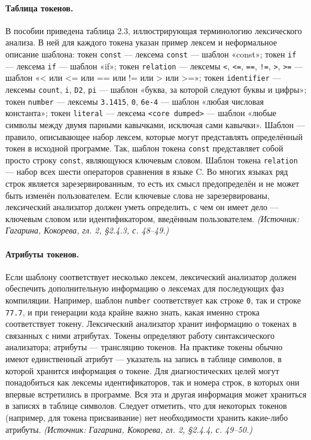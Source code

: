 \documentclass[a4paper,12pt]{article}
\begin{document}
\paragraph{Таблица токенов.}
В пособии приведена таблица 2.3, иллюстрирующая терминологию лексического анализа. В ней для каждого токена указан пример лексем и неформальное описание шаблона: токен \texttt{const} — лексема \texttt{const} — шаблон «const»; токен \texttt{if} — лексема \texttt{if} — шаблон «if»; токен \texttt{relation} — лексемы \texttt{<}, \texttt{<=}, \texttt{==}, \texttt{!=}, \texttt{>}, \texttt{>=} — шаблон «< или <= или == или != или > или >=»; токен \texttt{identifier} — лексемы \texttt{count}, \texttt{i}, \texttt{D2}, \texttt{pi} — шаблон «буква, за которой следуют буквы и цифры»; токен \texttt{number} — лексемы \texttt{3.1415}, \texttt{0}, \texttt{6e-4} — шаблон «любая числовая константа»; токен \texttt{literal} — лексема \texttt{<core dumped>} — шаблон «любые символы между двумя парными кавычками, исключая сами кавычки». Шаблон — правило, описывающее набор лексем, которые могут представлять определённый токен в исходной программе. Так, шаблон токена \texttt{const} представляет собой просто строку \texttt{const}, являющуюся ключевым словом. Шаблон токена \texttt{relation} — набор всех шести операторов сравнения в языке C. Во многих языках ряд строк является зарезервированным, то есть их смысл предопределён и не может быть изменён пользователем. Если ключевые слова не зарезервированы, лексический анализатор должен уметь определить, с чем он имеет дело — ключевым словом или идентификатором, введённым пользователем.
\textit{(Источник: Гагарина, Кокорева, гл. 2, §2.4.3, с. 48--49.)}

\paragraph{Атрибуты токенов.}
Если шаблону соответствует несколько лексем, лексический анализатор должен обеспечить дополнительную информацию о лексемах для последующих фаз компиляции. Например, шаблон \texttt{number} соответствует как строке \texttt{0}, так и строке \texttt{77.7}, и при генерации кода крайне важно знать, какая именно строка соответствует токену. Лексический анализатор хранит информацию о токенах в связанных с ними атрибутах. Токены определяют работу синтаксического анализатора; атрибуты — трансляцию токенов. На практике токены обычно имеют единственный атрибут — указатель на запись в таблице символов, в которой хранится информация о токене. Для диагностических целей могут понадобиться как лексемы идентификаторов, так и номера строк, в которых они впервые встретились в программе. Вся эта и другая информация может храниться в записях в таблице символов. Следует отметить, что для некоторых токенов (например, для токена присваивание) нет необходимости хранить какие-либо атрибуты.
\textit{(Источник: Гагарина, Кокорева, гл. 2, §2.4.4, с. 49--50.)}
\end{document}
